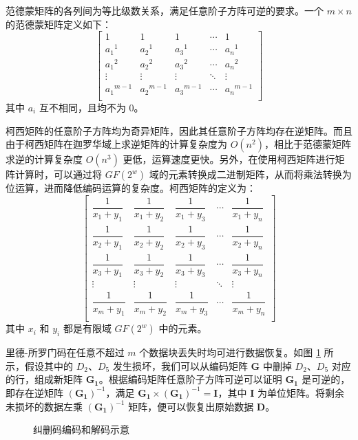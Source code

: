 范德蒙矩阵的各列间为等比级数关系，满足任意阶子方阵可逆的要求。一个 $m{\times}n$ 的范德蒙矩阵定义如下：
$$
\begin{bmatrix}
1 & 1 & 1 & \cdots & 1 \\
{a_1}^1 & {a_2}^1 & {a_3}^1 & \cdots & {a_n}^1 \\
{a_1}^2 & {a_2}^2 & {a_3}^2 & \cdots & {a_n}^2 \\
\vdots & \vdots & \vdots & \ddots & \vdots \\
{a_1}^{m-1} & {a_2}^{m-1} & {a_3}^{m-1} & \cdots & {a_n}^{m-1} \\
\end{bmatrix}
$$
其中 $a_i$ 互不相同，且均不为 0。

柯西矩阵的任意阶子方阵均为奇异矩阵，因此其任意阶子方阵均存在逆矩阵。而且由于柯西矩阵在迦罗华域上求逆矩阵的计算复杂度为 $O(n^2)$，相比于范德蒙矩阵求逆的计算复杂度 $O(n^3)$ 更低，运算速度更快。另外，在使用柯西矩阵进行矩阵计算时，可以通过将 $GF(2^w)$ 域的元素转换成二进制矩阵，从而将乘法转换为位运算，进而降低编码运算的复杂度。柯西矩阵的定义为：
$$
\begin{bmatrix}
\dfrac{1}{x_1+y_1} & \dfrac{1}{x_1+y_2} & \dfrac{1}{x_1+y_3} & \cdots & \dfrac{1}{x_1+y_n} \\
\dfrac{1}{x_2+y_1} & \dfrac{1}{x_2+y_2} & \dfrac{1}{x_2+y_3} & \cdots & \dfrac{1}{x_2+y_n} \\
\dfrac{1}{x_3+y_1} & \dfrac{1}{x_3+y_2} & \dfrac{1}{x_3+y_3} & \cdots & \dfrac{1}{x_3+y_n} \\
\vdots & \vdots & \vdots & \ddots & \vdots \\
\dfrac{1}{x_m+y_1} & \dfrac{1}{x_m+y_2} & \dfrac{1}{x_m+y_3} & \cdots & \dfrac{1}{x_m+y_n} \\
\end{bmatrix}
$$
其中 $x_i$ 和 $y_i$ 都是有限域 $GF(2^w)$ 中的元素。

里德-所罗门码在任意不超过 $m$ 个数据块丢失时均可进行数据恢复。如图 \ref{p1} 所示，假设其中的 $D_2$、$D_5$ 发生损坏，我们可以从编码矩阵 $\boldsymbol{G}$ 中删掉 $D_2$、$D_5$ 对应的行，组成新矩阵 $\boldsymbol{G_1}$。根据编码矩阵任意阶子方阵可逆可以证明 $\boldsymbol{G_1}$ 是可逆的，即存在逆矩阵 $(\boldsymbol{G_1})^{-1}$，满足 $\boldsymbol{G_1}{\times}(\boldsymbol{G_1})^{-1}=\boldsymbol{I}$，其中 $\boldsymbol{I}$ 为单位矩阵。将剩余未损坏的数据左乘 $(\boldsymbol{G_1})^{-1}$ 矩阵，便可以恢复出原始数据 $\boldsymbol{D}$。

\begin{figure}[!htb]
\centering
\resizebox{.8\textwidth}{!}{}
\caption{纠删码编码和解码示意}
\label{p1}
\end{figure}
